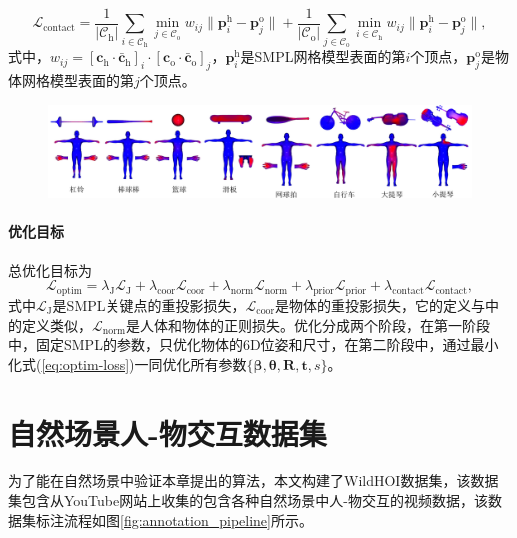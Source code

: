 \begin{equation}
	\mathcal{L}_{\text{contact}} = \frac{1}{| \mathcal{C}_{\text{h}}|}\sum_{i \in \mathcal{C}_{\text{h}}} \min_{j\in \mathcal{C}_{\text{o}}} w_{ij} \| \mathbf{p}^{\text{h}}_{i} - \mathbf{p}^{\text{o}}_{j} \| + \frac{1}{| \mathcal{C}_{\text{o}}|}\sum_{j \in \mathcal{C}_{\text{o}}} \min_{i \in \mathcal{C}_{\text{h}}} w_{ij} \| \mathbf{p}^{\text{h}}_i - \mathbf{p}^{\text{o}}_j \|,
\end{equation}
式中，$w_{ij} = [\mathbf{c}_{\text{h}} \cdot \bar{\mathbf{c}}_{\text{h}}]_i \cdot [\mathbf{c}_{\text{o}} \cdot \bar{\mathbf{c}}_{\text{o}}]_j$，$\mathbf{p}_{i}^{\text{h}}$是SMPL网格模型表面的第$i$个顶点，$\mathbf{p}_j^{\text{o}}$是物体网格模型表面的第$j$个顶点。

\begin{figure}[!htbp]
	\centering
	\includegraphics[width=\linewidth]{Img/mean_occlusion_maps_2}
	\label{fig:mean_occlusio_maps}
\end{figure}

\paragraph{优化目标}
总优化目标为
\begin{equation}\label{eq:optim-loss}
	\mathcal{L}_{\text{optim}} = \lambda_{\text{J}} \mathcal{L}_{\text{J}} + \lambda_{\text{coor}} \mathcal{L}_{\text{coor}} + \lambda_{\text{norm}} \mathcal{L}_{\text{norm}} + \lambda_{\text{prior}} \mathcal{L}_{\text{prior}} + \lambda_{\text{contact}} \mathcal{L}_{\text{contact}},
\end{equation}
式中$\mathcal{L}_{\text{J}}$是SMPL关键点的重投影损失，$\mathcal{L}_{\text{coor}}$是物体的重投影损失，它的定义与\citet{ijcai2023p100}中的定义类似，$\mathcal{L}_{\text{norm}}$是人体和物体的正则损失。优化分成两个阶段，在第一阶段中，固定SMPL的参数，只优化物体的6D位姿和尺寸，在第二阶段中，通过最小化式(\ref{eq:optim-loss})一同优化所有参数$\{\mathbf{\beta}, \mathbf{\theta}, \mathbf{R}, \mathbf{t}, s\}$。

\section{自然场景人-物交互数据集}
为了能在自然场景中验证本章提出的算法，本文构建了WildHOI数据集，该数据集包含从YouTube网站上收集的包含各种自然场景中人-物交互的视频数据，该数据集标注流程如图\ref{fig:annotation_pipeline}所示。

